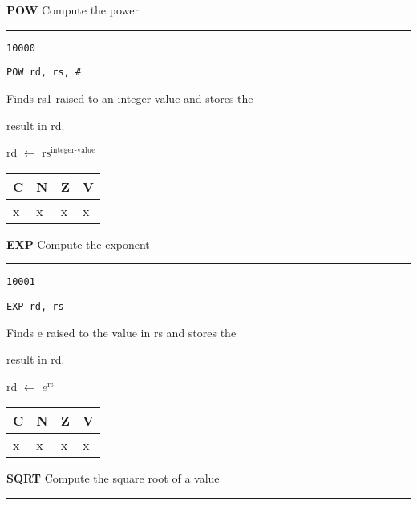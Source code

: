 \documentclass{article}
\begin{document}
\bigskip\bigskip

\flushleft
\LARGE\textbf{POW} \large \hfill Compute the power

\kern-3pt
\noindent\rule{16.5cm}{0.4pt}
\normalsize

{\large
	 \texttt{10000} \par
	\smallbreak
	 \texttt{POW rd, rs, \#<integer-value>} \par
	\smallbreak
	 Finds rs1 raised to an integer value and stores the \par
	\makebox[3.5cm][l]{  } result in rd. \par
	\smallbreak
	 rd $\leftarrow$ $\textrm{rs}^{\textrm{integer-value}}$ \par
	\smallbreak
	 \begin{tabular}{llll} C \quad & N \quad & Z \quad & V \\ \hline x & x & x & x \\ \end{tabular}
}

\bigskip\bigskip

\flushleft
\LARGE\textbf{EXP} \large \hfill Compute the exponent

\kern-3pt
\noindent\rule{16.5cm}{0.4pt}
\normalsize

{\large
	 \texttt{10001} \par
	\smallbreak
	 \texttt{EXP rd, rs} \par
	\smallbreak
	 Finds e raised to the value in rs and stores the \par
	\makebox[3.5cm][l]{  } result in rd. \par
	\smallbreak
	 rd $\leftarrow$ $e^{\textrm{rs}}$ \par
	\smallbreak
	 \begin{tabular}{llll} C \quad & N \quad & Z \quad & V \\ \hline x & x & x & x \\ \end{tabular}
}

\pagebreak

\flushleft
\LARGE\textbf{SQRT} \large \hfill Compute the square root of a value

\kern-3pt
\noindent\rule{16.5cm}{0.4pt}
\normalsize
\end{document}
